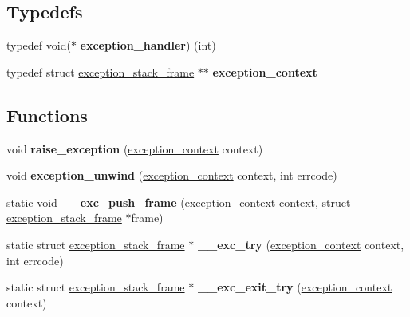 \subsection*{Typedefs}
\begin{DoxyCompactItemize}
\item 
\mbox{\label{group__exceptions_ga07c60bc46505779b049ce597fe609258}} 
typedef void($\ast$ {\bfseries exception\+\_\+handler}) (int)
\item 
\mbox{\label{group__exceptions_ga644495f4913e96a83cdf2779fd813974}} 
typedef struct \hyperlink{structexception__stack__frame}{exception\+\_\+stack\+\_\+frame} $\ast$$\ast$ {\bfseries exception\+\_\+context}
\end{DoxyCompactItemize}
\subsection*{Functions}
\begin{DoxyCompactItemize}
\item 
\mbox{\label{group__exceptions_ga7eda2653ee54e0c95e9d51b8fd873298}} 
void {\bfseries raise\+\_\+exception} (\hyperlink{structexception__stack__frame}{exception\+\_\+context} context)
\item 
\mbox{\label{group__exceptions_ga5232fee2c414c5ff1ff44dc28c83cf42}} 
void {\bfseries exception\+\_\+unwind} (\hyperlink{structexception__stack__frame}{exception\+\_\+context} context, int errcode)
\item 
\mbox{\label{group__exceptions_gad0ebd2587ae85b044e1306a026246a27}} 
static void {\bfseries \+\_\+\+\_\+exc\+\_\+push\+\_\+frame} (\hyperlink{structexception__stack__frame}{exception\+\_\+context} context, struct \hyperlink{structexception__stack__frame}{exception\+\_\+stack\+\_\+frame} $\ast$frame)
\item 
\mbox{\label{group__exceptions_ga47cfe7a060b16ac1cd9a4432853205dc}} 
static struct \hyperlink{structexception__stack__frame}{exception\+\_\+stack\+\_\+frame} $\ast$ {\bfseries \+\_\+\+\_\+exc\+\_\+try} (\hyperlink{structexception__stack__frame}{exception\+\_\+context} context, int errcode)
\item 
\mbox{\label{group__exceptions_ga9d85149bdb927245ff694068119412df}} 
static struct \hyperlink{structexception__stack__frame}{exception\+\_\+stack\+\_\+frame} $\ast$ {\bfseries \+\_\+\+\_\+exc\+\_\+exit\+\_\+try} (\hyperlink{structexception__stack__frame}{exception\+\_\+context} context)
\end{DoxyCompactItemize}


